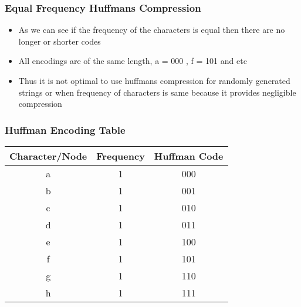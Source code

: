 \documentclass[10pt,aspectratio=43]{beamer}
\begin{document}
\begin{frame}
    \frametitle{\textcolor{myMaroon}{Equal Frequency Huffmans Compression}}
    \begin{itemize}
        \item As we can see if the frequency of the characters is equal then there are no longer or shorter codes

        \vspace{0.4cm}
        \item All encodings are of the same length, a = 000 , f = 101 and etc

        \vspace{0.4cm}
        \item Thus it is not optimal to use huffmans compression for randomly generated strings or when frequency of characters is same because it provides negligible compression
    \end{itemize}
\end{frame}


\begin{frame}
    \frametitle{\textcolor{myMaroon}{Huffman Encoding Table}}
    
    \begin{center}
        \begin{tabular}{c c c}
            \toprule
            \textcolor{myMaroon}{\textbf{Character/Node}} & 
            \textcolor{myMaroon}{\textbf{Frequency}} & 
            \textcolor{myMaroon}{\textbf{Huffman Code}} \\
            \midrule
            a & 1 & 000 \\[0.2cm]
            b & 1 & 001 \\[0.2cm]
            c & 1 & 010 \\[0.2cm]
            d & 1 & 011 \\[0.2cm]
            e & 1 & 100 \\[0.2cm]
            f & 1 & 101\\[0.2cm]
            g & 1 & 110 \\[0.2cm]
            h & 1 & 111 \\[0.2cm]
            
            \bottomrule
        \end{tabular}
    \end{center}
\end{frame}
\end{document}
